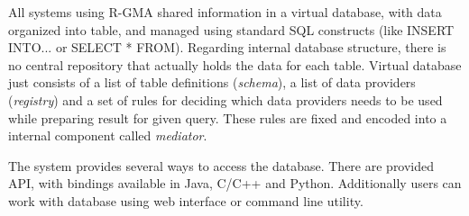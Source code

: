 All systems using R-GMA shared information in a virtual database, with data organized into table, and managed using standard SQL constructs (like INSERT INTO... or SELECT * FROM). Regarding internal database structure, there is no central repository that actually holds the data for each table. Virtual database just consists of a list of table definitions (\emph{schema}), a list of data providers (\emph{registry}) and a set of rules for deciding which data providers needs to be used while preparing result for given query. These rules are fixed and encoded into a internal component called \emph{mediator}.

The system provides several ways to access the database. There are provided API, with bindings available in Java, C/C++ and Python. Additionally users can work with database using web interface or command line utility.

